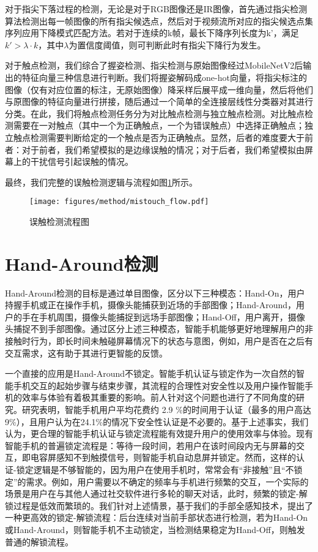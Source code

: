 对于指尖下落过程的检测，无论是对于RGB图像还是IR图像，首先通过\label{cha:fingertip}指尖检测算法检测出每一帧图像的所有指尖候选点，然后对于视频流所对应的指尖候选点集序列应用下降模式匹配\label{cha:motion}方法。若对于连续的k帧，最长下降序列长度为k'，满足$k'>\lambda \cdot k$，其中$\lambda$为置信度阈值，则可判断此时有指尖下降行为发生。

对于触点检测，我们综合了握姿检测、指尖检测与原始图像经过MobileNetV2后输出的特征向量三种信息进行判断。我们将握姿解码成one-hot向量，将指尖标注的图像（仅有对应位置的标注，无原始图像）降采样后展平成一维向量，然后将他们与原图像的特征向量进行拼接，随后通过一个简单的全连接层线性分类器对其进行分类。在此，我们将触点检测任务分为对比触点检测与独立触点检测。对比触点检测需要在一对触点（其中一个为正确触点，一个为错误触点）中选择正确触点；独立触点检测需要判断给定的一个触点是否为正确触点。显然，后者的难度要大于前者：对于前者，我们希望模拟的是边缘误触的情况；对于后者，我们希望模拟由屏幕上的干扰信号引起误触的情况。

最终，我们完整的误触检测逻辑与流程如图\ref{fig:mistouch_flow}所示。

\begin{figure}[h]
  \centering
  \texttt{[image: figures/method/mistouch\_flow.pdf]}
  \caption{误触检测流程图}
  \label{fig:mistouch_flow}
\end{figure}

\section{Hand-Around检测}

Hand-Around检测的目标是通过单目图像，区分以下三种模态：Hand-On，用户持握手机或正在操作手机，摄像头能捕获到近场的手部图像；Hand-Around，用户的手在手机周围，摄像头能捕捉到远场手部图像；Hand-Off，用户离开，摄像头捕捉不到手部图像。通过区分上述三种模态，智能手机能够更好地理解用户的非接触时行为，即长时间未触碰屏幕情况下的状态与意图，例如，用户是否在之后有交互需求，这有助于其进行更智能的反馈。

一个直接的应用是Hand-Around不锁定。智能手机认证与锁定作为一次自然的智能手机交互的起始步骤与结束步骤，其流程的合理性对安全性以及用户操作智能手机的效率与体验有着极其重要的影响。前人针对这个问题也进行了不同角度的研究。研究表明，智能手机用户平均花费约 2.9 \%的时间用于认证（最多的用户高达9\%），且用户认为在24.1\%的情况下安全性认证是不必要的\cite{185310}。基于上述事实，我们认为，更合理的智能手机认证与锁定流程能有效提升用户的使用效率与体验。现有智能手机的普遍锁定流程是：等待一段时间，若用户在该时间段内无与屏幕的交互，即电容屏感知不到触摸信号，则智能手机自动息屏并锁定。然而，这样的认证-锁定逻辑是不够智能的，因为用户在使用手机时，常常会有“非接触”且“不锁定”的需求。例如，用户需要以不确定的频率与手机进行频繁的交互，一个实际的场景是用户在与其他人通过社交软件进行多轮的聊天对话，此时，频繁的锁定-解锁过程是低效而繁琐的。我们针对上述情景，基于我们的手部全感知技术，提出了一种更高效的锁定-解锁流程：后台连续对当前手部状态进行检测，若为Hand-On或Hand-Around，则智能手机不主动锁定，当检测结果稳定为Hand-Off，则触发普通的解锁流程。

